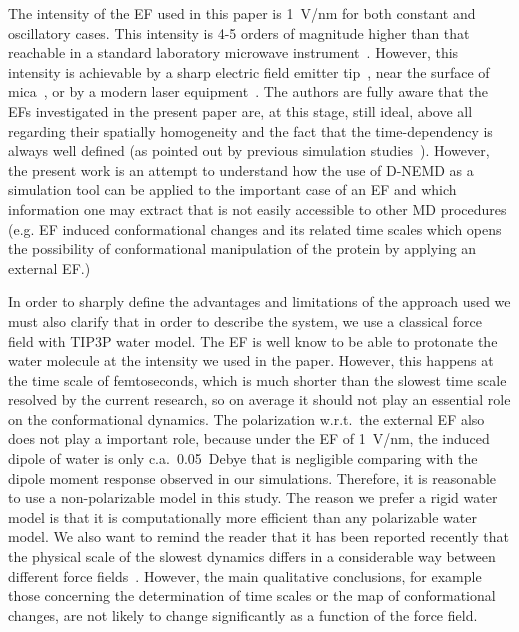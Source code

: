\documentclass[a4paper,preprint,unsortedaddress,onecolumn]{revtex4-1}
\begin{document}
The intensity of the EF used in this paper is 1~V/nm for both constant
and oscillatory cases. This intensity is 4-5 orders of magnitude
higher than that reachable in a standard laboratory microwave
instrument~\cite{damm2012can}. However, this intensity is achievable
by a sharp electric field emitter tip~\cite{scovell2000phase}, near
the surface of mica~\cite{starzyk2013proteins}, or by a modern laser
equipment~\cite{vogel2008femtosecond}. The authors are fully aware
that the EFs investigated in the present paper are, at this stage, still ideal, above all regarding their spatially homogeneity and
  the fact that the time-dependency is always well defined (as pointed
out by previous simulation studies~\cite{budi2005electric,
  budi2007effect, budi2008comparative, toschi2008effects,
  astrakas2011electric, astrakas2012structural, damm2012can,
  starzyk2013proteins, english2009nonequilibrium,
  solomentsev2012effects}). However, the present work is an attempt to understand how the use of D-NEMD as a simulation tool can be applied to the important case of an EF and which information one may extract that is not easily accessible to other MD procedures (e.g.  EF induced conformational changes and its related time scales which opens the
possibility of conformational manipulation of the protein by applying
an external EF.)

In order to sharply define the advantages and limitations of the approach used we must also clarify that in order to describe the system, we use a classical force field with TIP3P water model.
The EF is well know to be able to protonate the water molecule at the
intensity we used in the paper. However, this happens at the time
scale of femtoseconds, which is much shorter than the slowest time
scale resolved by the current research, so on average it should not play an essential role on the conformational dynamics.
The polarization w.r.t.~the external EF also does
not play a important role, because  under the EF of 1~V/nm, the induced dipole
of water is only c.a.~0.05~Debye that is negligible comparing with the
dipole moment response observed in our simulations.  Therefore, it is
reasonable to use a non-polarizable model in this study.  The reason we
prefer a rigid water model is that it is computationally more
efficient than any polarizable water model.  We also want to remind
the reader that it has been reported recently that the physical scale of the slowest
dynamics differs in a considerable way between different force
fields~\cite{vitalini2013speed}. However, the main qualitative conclusions, for
example those concerning the determination of time scales or the map of conformational changes, 
are not likely to change significantly as a function of the force field.
\end{document}
